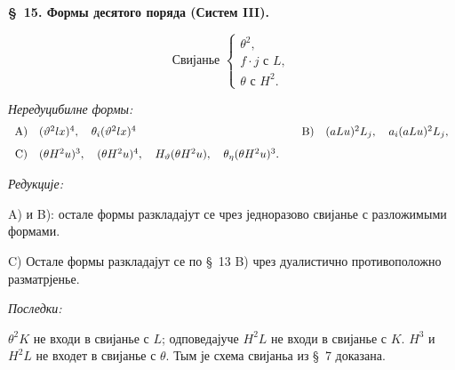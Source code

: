 ﻿\documentclass[11pt]{article}
\begin{document}
\begin{center}
\textbf{\S\ 15. \quad Формы десятого поряда (Систем III).}
\end{center}
\[
\text{Свијанье }\left\{\begin{array}{l}
\theta^2,\\
f\cdot j \text{ с }L,\\
\theta \text{ с }H^2.
\end{array}\right.
\]

\noindent\textit{Нередуцибилне формы:}
\[
\begin{array}{c@{\quad}l@{\qquad}c@{\quad}l}
\mathrm{A)}&(\vartheta^2lx)^4,\quad
\theta_i(\vartheta^2lx)^4&
\mathrm{B)}&(aLu)^2L_j,\quad a_i(aLu)^2L_j,\\[0.8em]
\mathrm{C)}&(\theta H^2u)^3,\quad
(\theta H^2u)^4,\quad
H_\vartheta(\theta H^2u),\quad
\theta_\eta(\theta H^2u)^3.
\end{array}
\]

\noindent\textit{Редукције:}

\noindent\mbox{A)} и \mbox{B)}: остале формы разкладајут се чрез једноразово свијанье с разложимыми формами.

\noindent\mbox{C)} Остале формы разкладајут се по \S\ 13 \mbox{B)} чрез дуалистично противоположно разматрјенье.

\noindent\textit{Последки:}

$\theta^2K$ не входи в свијанье с $L$; одповедајуче $H^2L$ не входи в свијанье с $K$. $H^3$ и $H^2L$ не входет в свијанье с $\theta$. Тым је схема свијаньа из \S\ 7 доказана.
\end{document}
